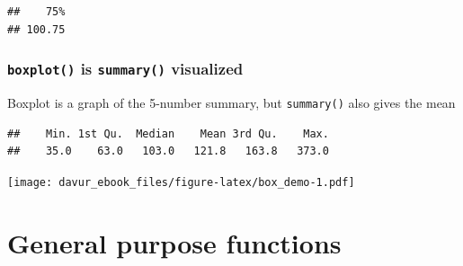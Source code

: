 \documentclass[]{book}
\newenvironment{Shaded}{\begin{snugshade}}{\end{snugshade}}
\newcommand{\CommentTok}[1]{\textcolor[rgb]{0.56,0.35,0.01}{\textit{#1}}}
\newcommand{\DataTypeTok}[1]{\textcolor[rgb]{0.13,0.29,0.53}{#1}}
\newcommand{\FloatTok}[1]{\textcolor[rgb]{0.00,0.00,0.81}{#1}}
\newcommand{\KeywordTok}[1]{\textcolor[rgb]{0.13,0.29,0.53}{\textbf{#1}}}
\newcommand{\NormalTok}[1]{#1}
\newcommand{\OperatorTok}[1]{\textcolor[rgb]{0.81,0.36,0.00}{\textbf{#1}}}
\begin{document}
\begin{Shaded}
\end{Shaded}

\begin{verbatim}
##    75% 
## 100.75
\end{verbatim}

\hypertarget{boxplot-is-summary-visualized}{%
\subsubsection*{\texorpdfstring{\texttt{boxplot()} is \texttt{summary()} visualized}{boxplot() is summary() visualized}}\label{boxplot-is-summary-visualized}}

Boxplot is a graph of the 5-number summary, but \texttt{summary()} also gives the mean

\begin{Shaded}
\end{Shaded}

\begin{verbatim}
##    Min. 1st Qu.  Median    Mean 3rd Qu.    Max. 
##    35.0    63.0   103.0   121.8   163.8   373.0
\end{verbatim}

\begin{Shaded}
\end{Shaded}

\texttt{[image: davur\_ebook\_files/figure-latex/box\_demo-1.pdf]}

\hypertarget{general-purpose-functions}{%
\section{General purpose functions}\label{general-purpose-functions}}
\end{document}
